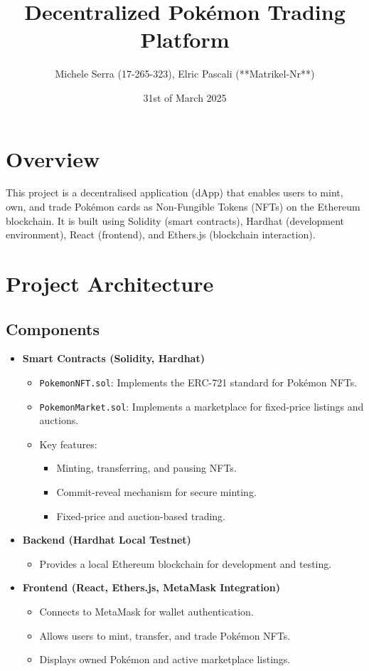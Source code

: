\documentclass{article}
\title{Decentralized Pokémon Trading Platform}
\author{Michele Serra (17-265-323), Elric Pascali (**Matrikel-Nr**)}
\date{31st of March 2025}
\begin{document}
\maketitle

\section{Overview}
This project is a decentralised application (dApp) that enables users to mint, own, and trade Pokémon cards as Non-Fungible Tokens (NFTs) on the Ethereum blockchain. It is built using Solidity (smart contracts), Hardhat (development environment), React (frontend), and Ethers.js (blockchain interaction).

\section{Project Architecture}
\subsection{Components}
\begin{itemize}
    \item \textbf{Smart Contracts (Solidity, Hardhat)}
    \begin{itemize}
        \item \texttt{PokemonNFT.sol}: Implements the ERC-721 standard for Pokémon NFTs.
        \item \texttt{PokemonMarket.sol}: Implements a marketplace for fixed-price listings and auctions.
        \item Key features:
        \begin{itemize}
            \item Minting, transferring, and pausing NFTs.
            \item Commit-reveal mechanism for secure minting.
            \item Fixed-price and auction-based trading.
        \end{itemize}
    \end{itemize}
    
    \item \textbf{Backend (Hardhat Local Testnet)}
    \begin{itemize}
        \item Provides a local Ethereum blockchain for development and testing.
    \end{itemize}
    
    \item \textbf{Frontend (React, Ethers.js, MetaMask Integration)}
    \begin{itemize}
        \item Connects to MetaMask for wallet authentication.
        \item Allows users to mint, transfer, and trade Pokémon NFTs.
        \item Displays owned Pokémon and active marketplace listings.
    \end{itemize}
\end{itemize}
\end{document}
